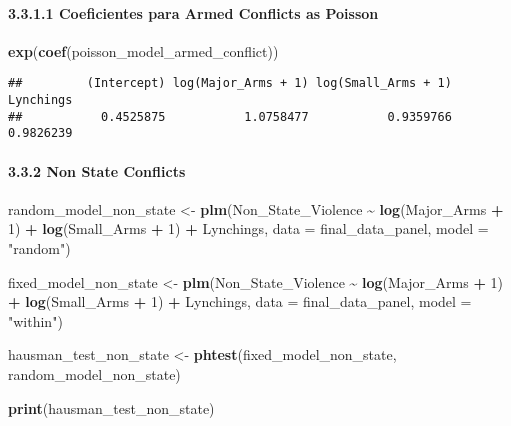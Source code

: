 \documentclass[
  11pt,
]{article}
\newenvironment{Shaded}{\begin{snugshade}}{\end{snugshade}}
\newcommand{\AttributeTok}[1]{\textcolor[rgb]{0.13,0.29,0.53}{#1}}
\newcommand{\DecValTok}[1]{\textcolor[rgb]{0.00,0.00,0.81}{#1}}
\newcommand{\FunctionTok}[1]{\textcolor[rgb]{0.13,0.29,0.53}{\textbf{#1}}}
\newcommand{\NormalTok}[1]{#1}
\newcommand{\OtherTok}[1]{\textcolor[rgb]{0.56,0.35,0.01}{#1}}
\newcommand{\SpecialCharTok}[1]{\textcolor[rgb]{0.81,0.36,0.00}{\textbf{#1}}}
\newcommand{\StringTok}[1]{\textcolor[rgb]{0.31,0.60,0.02}{#1}}
\begin{document}
\paragraph{3.3.1.1 Coeficientes para Armed Conflicts as
Poisson}\label{coeficientes-para-armed-conflicts-as-poisson}

\begin{Shaded}
\begin{Highlighting}[]
\FunctionTok{exp}\NormalTok{(}\FunctionTok{coef}\NormalTok{(poisson\_model\_armed\_conflict))}
\end{Highlighting}
\end{Shaded}

\begin{verbatim}
##         (Intercept) log(Major_Arms + 1) log(Small_Arms + 1)           Lynchings 
##           0.4525875           1.0758477           0.9359766           0.9826239
\end{verbatim}

\paragraph{3.3.2 Non State Conflicts}\label{non-state-conflicts}

\begin{Shaded}
\begin{Highlighting}[]
\NormalTok{random\_model\_non\_state }\OtherTok{\textless{}{-}} \FunctionTok{plm}\NormalTok{(Non\_State\_Violence }\SpecialCharTok{\textasciitilde{}} \FunctionTok{log}\NormalTok{(Major\_Arms }\SpecialCharTok{+} \DecValTok{1}\NormalTok{) }\SpecialCharTok{+} \FunctionTok{log}\NormalTok{(Small\_Arms }\SpecialCharTok{+} \DecValTok{1}\NormalTok{) }\SpecialCharTok{+}\NormalTok{ Lynchings,                                }\AttributeTok{data =}\NormalTok{ final\_data\_panel, }\AttributeTok{model =} \StringTok{"random"}\NormalTok{)}

\NormalTok{fixed\_model\_non\_state }\OtherTok{\textless{}{-}} \FunctionTok{plm}\NormalTok{(Non\_State\_Violence }\SpecialCharTok{\textasciitilde{}} \FunctionTok{log}\NormalTok{(Major\_Arms }\SpecialCharTok{+} \DecValTok{1}\NormalTok{) }\SpecialCharTok{+} \FunctionTok{log}\NormalTok{(Small\_Arms }\SpecialCharTok{+} \DecValTok{1}\NormalTok{) }\SpecialCharTok{+}\NormalTok{ Lynchings,                               }\AttributeTok{data =}\NormalTok{ final\_data\_panel, }\AttributeTok{model =} \StringTok{"within"}\NormalTok{)}

\NormalTok{hausman\_test\_non\_state }\OtherTok{\textless{}{-}} \FunctionTok{phtest}\NormalTok{(fixed\_model\_non\_state, random\_model\_non\_state)}

\FunctionTok{print}\NormalTok{(hausman\_test\_non\_state)  }
\end{Highlighting}
\end{Shaded}
\end{document}
